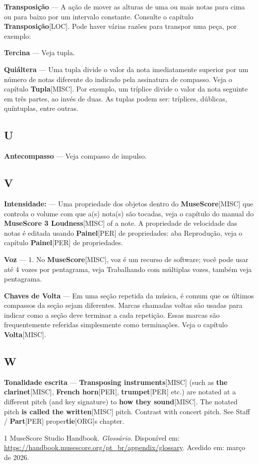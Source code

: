 \documentclass[a4paper,12pt]{article}
\begin{document}
\textbf{Transposição} --- A ação de mover as alturas de uma ou mais notas para cima ou para baixo por um intervalo constante. Consulte o capítulo \textbf{Transposição}\textsc{[LOC]}. Pode haver várias razões para transpor uma peça, por exemplo:

\textbf{Tercina} --- Veja tupla.

\textbf{Quiáltera} --- Uma tupla divide o valor da nota imediatamente superior por um número de notas diferente do indicado pela assinatura de compasso. Veja o capítulo \textbf{Tupla}\textsc{[MISC]}. Por exemplo, um tríplice divide o valor da nota seguinte em três partes, ao invés de duas. As tuplas podem ser: tríplices, dúblicas, quíntuplas, entre outras.

\subsection*{U}
\textbf{Antecompasso} --- Veja compasso de impulso.

\subsection*{V}
\textbf{Intensidade:} --- Uma propriedade dos objetos dentro do \textbf{MuseScore}\textsc{[MISC]} que controla o volume com que a(s) nota(s) são tocadas, veja o capítulo do manual do \textbf{MuseScore 3 Loudness}\textsc{[MISC]} of a note. A propriedade de velocidade das notas é editada usando \textbf{Painel}\textsc{[PER]} de propriedades: aba Reprodução, veja o capítulo \textbf{Painel}\textsc{[PER]} de propriedades.

\textbf{Voz} --- 1. No \textbf{MuseScore}\textsc{[MISC]}, voz é um recurso de software; você pode usar até 4 vozes por pentagrama, veja Trabalhando com múltiplas vozes, também veja pentagrama.

\textbf{Chaves de Volta} --- Em uma seção repetida da música, é comum que os últimos compassos da seção sejam diferentes. Marcas chamadas voltas são usadas para indicar como a seção deve terminar a cada repetição. Essas marcas são frequentemente referidas simplesmente como terminações. Veja o capítulo \textbf{Volta}\textsc{[MISC]}.

\subsection*{W}
\textbf{Tonalidade escrita} --- \textbf{Transposing instruments}\textsc{[MISC]} (such as \textbf{the clarinet}\textsc{[MISC]}, \textbf{French horn}\textsc{[PER]}, \textbf{trumpet}\textsc{[PER]} etc.) are notated at a different pitch (and key signature) to \textbf{how they sound}\textsc{[MISC]}. The notated pitch \textbf{is called the written}\textsc{[MISC]} pitch. Contrast with concert pitch. See Staff / \textbf{Part}\textsc{[PER]} proper\textbf{tie}\textsc{[ORG]}s chapter.


\begin{thebibliography}{1}
MuseScore Studio Handbook.
\textit{Glossário}.
Disponível em: \url{https://handbook.musescore.org/pt_br/appendix/glossary}.
Acedido em: março de 2026.
\end{thebibliography}
\end{document}
